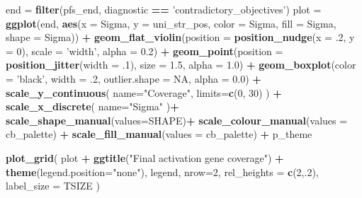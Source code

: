 \documentclass[]{book}
\newenvironment{Shaded}{\begin{snugshade}}{\end{snugshade}}
\newcommand{\DataTypeTok}[1]{\textcolor[rgb]{0.13,0.29,0.53}{#1}}
\newcommand{\DecValTok}[1]{\textcolor[rgb]{0.00,0.00,0.81}{#1}}
\newcommand{\FloatTok}[1]{\textcolor[rgb]{0.00,0.00,0.81}{#1}}
\newcommand{\KeywordTok}[1]{\textcolor[rgb]{0.13,0.29,0.53}{\textbf{#1}}}
\newcommand{\NormalTok}[1]{#1}
\newcommand{\OperatorTok}[1]{\textcolor[rgb]{0.81,0.36,0.00}{\textbf{#1}}}
\newcommand{\OtherTok}[1]{\textcolor[rgb]{0.56,0.35,0.01}{#1}}
\newcommand{\StringTok}[1]{\textcolor[rgb]{0.31,0.60,0.02}{#1}}
\begin{document}
\begin{Shaded}
\begin{Highlighting}[]
\NormalTok{end =}\StringTok{ }\KeywordTok{filter}\NormalTok{(pfs_end, diagnostic }\OperatorTok{==}\StringTok{ 'contradictory_objectives'}\NormalTok{)}
\NormalTok{plot =}\StringTok{ }\KeywordTok{ggplot}\NormalTok{(end, }\KeywordTok{aes}\NormalTok{(}\DataTypeTok{x =}\NormalTok{ Sigma, }\DataTypeTok{y =}\NormalTok{ uni_str_pos, }\DataTypeTok{color =}\NormalTok{ Sigma, }\DataTypeTok{fill =}\NormalTok{ Sigma, }\DataTypeTok{shape =}\NormalTok{ Sigma)) }\OperatorTok{+}
\StringTok{  }\KeywordTok{geom_flat_violin}\NormalTok{(}\DataTypeTok{position =} \KeywordTok{position_nudge}\NormalTok{(}\DataTypeTok{x =} \FloatTok{.2}\NormalTok{, }\DataTypeTok{y =} \DecValTok{0}\NormalTok{), }\DataTypeTok{scale =} \StringTok{'width'}\NormalTok{, }\DataTypeTok{alpha =} \FloatTok{0.2}\NormalTok{) }\OperatorTok{+}
\StringTok{  }\KeywordTok{geom_point}\NormalTok{(}\DataTypeTok{position =} \KeywordTok{position_jitter}\NormalTok{(}\DataTypeTok{width =} \FloatTok{.1}\NormalTok{), }\DataTypeTok{size =} \FloatTok{1.5}\NormalTok{, }\DataTypeTok{alpha =} \FloatTok{1.0}\NormalTok{) }\OperatorTok{+}
\StringTok{  }\KeywordTok{geom_boxplot}\NormalTok{(}\DataTypeTok{color =} \StringTok{'black'}\NormalTok{, }\DataTypeTok{width =} \FloatTok{.2}\NormalTok{, }\DataTypeTok{outlier.shape =} \OtherTok{NA}\NormalTok{, }\DataTypeTok{alpha =} \FloatTok{0.0}\NormalTok{) }\OperatorTok{+}
\StringTok{  }\KeywordTok{scale_y_continuous}\NormalTok{(}
    \DataTypeTok{name=}\StringTok{"Coverage"}\NormalTok{,}
    \DataTypeTok{limits=}\KeywordTok{c}\NormalTok{(}\DecValTok{0}\NormalTok{, }\DecValTok{30}\NormalTok{)}
\NormalTok{  ) }\OperatorTok{+}
\StringTok{  }\KeywordTok{scale_x_discrete}\NormalTok{(}
    \DataTypeTok{name=}\StringTok{"Sigma"}
\NormalTok{  )}\OperatorTok{+}
\StringTok{  }\KeywordTok{scale_shape_manual}\NormalTok{(}\DataTypeTok{values=}\NormalTok{SHAPE)}\OperatorTok{+}
\StringTok{  }\KeywordTok{scale_colour_manual}\NormalTok{(}\DataTypeTok{values =}\NormalTok{ cb_palette) }\OperatorTok{+}
\StringTok{  }\KeywordTok{scale_fill_manual}\NormalTok{(}\DataTypeTok{values =}\NormalTok{ cb_palette) }\OperatorTok{+}
\StringTok{  }\NormalTok{p_theme}

\KeywordTok{plot_grid}\NormalTok{(}
\NormalTok{  plot }\OperatorTok{+}
\StringTok{    }\KeywordTok{ggtitle}\NormalTok{(}\StringTok{"Final activation gene coverage"}\NormalTok{) }\OperatorTok{+}
\StringTok{    }\KeywordTok{theme}\NormalTok{(}\DataTypeTok{legend.position=}\StringTok{"none"}\NormalTok{),}
\NormalTok{  legend,}
  \DataTypeTok{nrow=}\DecValTok{2}\NormalTok{,}
  \DataTypeTok{rel_heights =} \KeywordTok{c}\NormalTok{(}\DecValTok{2}\NormalTok{,.}\DecValTok{2}\NormalTok{),}
  \DataTypeTok{label_size =}\NormalTok{ TSIZE}
\NormalTok{)}
\end{Highlighting}
\end{Shaded}
\end{document}
